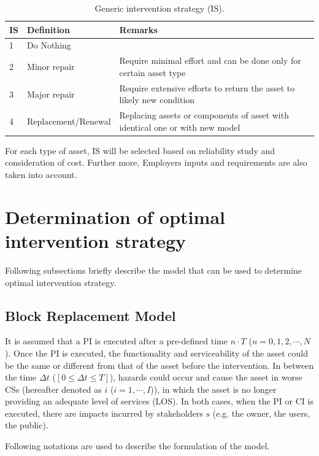 \begin{table}[h]
	\caption{Generic intervention strategy (IS).}
	\label{ch03:is}
	{\footnotesize
		\begin{tabular}{l|p{6cm}|p{6cm}}
			\hline
			IS & Definition &  Remarks \\ 
			\hline
			1 & Do Nothing &   \\ 
			2 & Minor repair  & Require minimal effort and can be done only for certain asset type \\ 
			3 & Major repair  & Require extensive efforts to return the asset to likely new condition \\ 
			4 & Replacement/Renewal  & Replacing assets or components of asset with identical one or with new model \\ 
			\hline
		\end{tabular}
	}
\end{table}

For each type of asset, IS will be selected based on reliability study and consideration of cost. Further more, Employers inputs and requirements are also taken into account.

\section{Determination of optimal intervention strategy}
\label{35}
Following subsections briefly describe the model that can be used to determine optimal intervention strategy. 
\subsection{Block Replacement Model} \label{blockreplace}
It is assumed that a PI is executed after a pre-defined time $n\cdot T$ ($n=0,1,2,\cdots,N$). Once the PI is executed, the functionality and serviceability of the asset could be the same or different from that of the asset before the intervention. In between the time $\Delta t$ ($[0\le \Delta t \le T]$), hazards could occur and cause the asset in worse CSs (hereafter denoted as $i$ ($i=1,\cdots,I$)), in which the asset is no longer providing an adequate level of services (LOS). In both cases, when the PI or CI is executed, there are impacts incurred by stakeholders $s$ (e.g. the owner, the users, the public).

Following notations are used to describe the formulation of the model.


